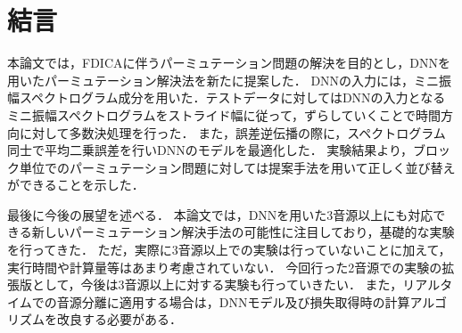 \chapter{結言}
\label{chap:con}

本論文では，FDICAに伴うパーミュテーション問題の解決を目的とし，DNNを用いたパーミュテーション解決法を新たに提案した．
DNNの入力には，ミニ振幅スペクトログラム成分を用いた．テストデータに対してはDNNの入力となるミニ振幅スペクトログラムをストライド幅に従って，ずらしていくことで時間方向に対して多数決処理を行った．
また，誤差逆伝播の際に，スペクトログラム同士で平均二乗誤差を行いDNNのモデルを最適化した．
実験結果より，ブロック単位でのパーミュテーション問題に対しては提案手法を用いて正しく並び替えができることを示した．

最後に今後の展望を述べる．
本論文では，DNNを用いた3音源以上にも対応できる新しいパーミュテーション解決手法の可能性に注目しており，基礎的な実験を行ってきた．
ただ，実際に3音源以上での実験は行っていないことに加えて，実行時間や計算量等はあまり考慮されていない．
今回行った2音源での実験の拡張版として，今後は3音源以上に対する実験も行っていきたい．
また，リアルタイムでの音源分離に適用する場合は，DNNモデル及び損失取得時の計算アルゴリズムを改良する必要がある．
